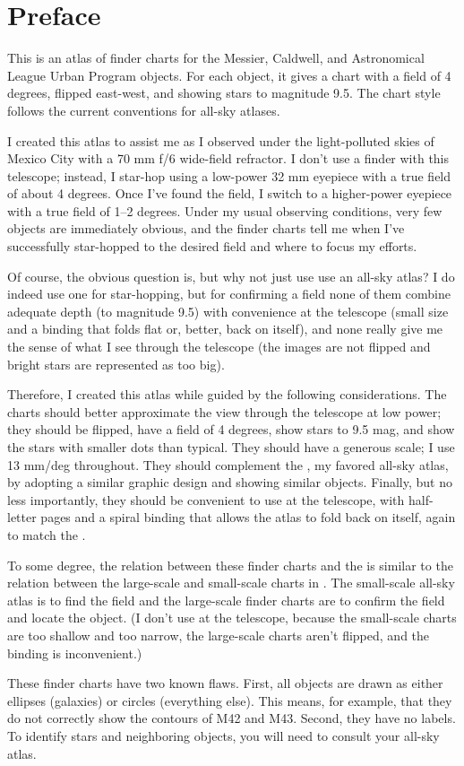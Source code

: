 
\chapter*{Preface}

This is an atlas of finder charts for the Messier, Caldwell, and Astronomical League Urban Program objects. For each object, it gives a chart with a field of 4 degrees, flipped east-west, and showing stars to magnitude 9.5. The chart style follows the current conventions for all-sky atlases.

I created this atlas to assist me as I observed under the light-polluted skies of Mexico City with a 70 mm f/6 wide-field refractor. I don't use a finder with this telescope; instead, I star-hop using a low-power 32 mm eyepiece with a true field of about 4 degrees. Once I’ve found the field, I switch to a higher-power eyepiece with a true field of 1–2 degrees. Under my usual observing conditions, very few objects are immediately obvious, and the finder charts tell me when I've successfully star-hopped to the desired field and where to focus my efforts.

Of course, the obvious question is, but why not just use use an all-sky atlas? I do indeed use one for star-hopping, but for confirming a field none of them combine adequate depth (to magnitude 9.5) with convenience at the telescope (small size and a binding that folds flat or, better, back on itself), and none really give me the sense of what I see through the telescope (the images are not flipped and bright stars are represented as too big).

Therefore, I created this atlas while guided by the following considerations. The charts should better approximate the view through the telescope at low power; they should be flipped, have a field of 4 degrees, show stars to 9.5 mag, and show the stars with smaller dots than typical.
They should have a generous scale; I use 13 mm/deg throughout.
They should complement the {\PSA}, my favored all-sky atlas, by adopting a similar graphic design and showing similar objects.  
Finally, but no less importantly, they should be convenient to use at the telescope, with half-letter pages and a spiral binding that allows the atlas to fold back on itself, again to match the {\PSA}.

To some degree, the relation between these finder charts and the {\PSA} is similar to the relation between the large-scale and small-scale charts in . The small-scale all-sky atlas is to find the field and the large-scale finder charts are to confirm the field and locate the object. (I don’t use  at the telescope, because the small-scale charts are too shallow and too narrow, the large-scale charts aren’t flipped, and the binding is inconvenient.) 

These finder charts have two known flaws. First, all objects are drawn as either ellipses (galaxies) or circles (everything else). This means, for example, that they do not correctly show the contours of M42 and M43. Second, they have no labels. To identify stars and neighboring objects, you will need to consult your all-sky atlas.

